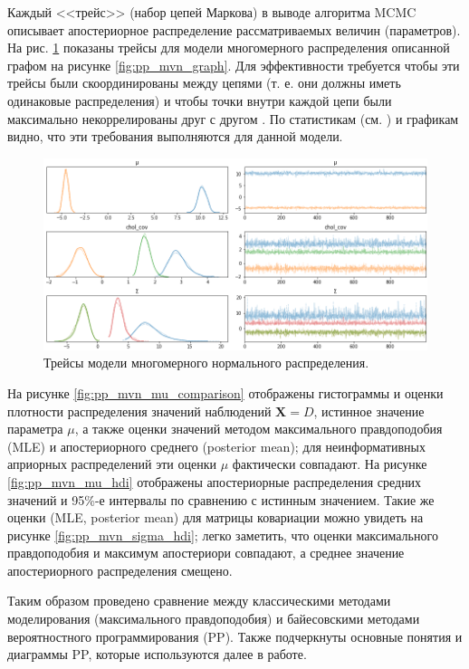 \documentclass[a4paper,14pt]{extreport}
\begin{document}
Каждый <<трейс>> (набор цепей Маркова) в выводе алгоритма MCMC описывает апостериорное распределение рассматриваемых величин (параметров). На рис. \ref{fig:pp_mvn_trace} показаны трейсы для модели многомерного распределения описанной графом на рисунке \ref{fig:pp_mvn_graph}. Для эффективности требуется чтобы эти трейсы были скоординированы между цепями (т. е. они должны иметь одинаковые распределения) и чтобы точки внутри каждой цепи были максимально некоррелированы друг с другом \cite{stan_user_guide}. По статистикам (см. ) и графикам видно, что эти требования выполняются для данной модели.

\begin{figure}[H]
	\includegraphics[width=\linewidth]{img/gen/pp_mvn_trace.png}
	\caption{Трейсы модели многомерного нормального распределения. }
	\label{fig:pp_mvn_trace}
\end{figure}

На рисунке \ref{fig:pp_mvn_mu_comparison} отображены гистограммы и оценки плотности распределения значений наблюдений $\mathbf{X} = D$, истинное значение параметра $\mu$, а также оценки значений методом максимального правдоподобия (MLE) и апостериорного среднего (posterior mean); для неинформативных априорных распределений эти оценки $\mu$ фактически совпадают. На рисунке \ref{fig:pp_mvn_mu_hdi} отображены апостериорные распределения средних значений и 95\%-е интервалы по сравнению с истинным значением. Такие же оценки (MLE, posterior mean) для матрицы ковариации можно увидеть на рисунке \ref{fig:pp_mvn_sigma_hdi}; легко заметить, что оценки максимального правдоподобия и максимум апостериори совпадают, а среднее значение апостериорного распределения смещено.

Таким образом проведено сравнение между классическими методами моделирования (максимального правдоподобия) и байесовскими методами вероятностного программирования (PP). Также подчеркнуты основные понятия и диаграммы PP, которые используются далее в работе.
\end{document}
